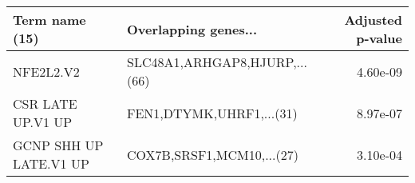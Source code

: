 \begin{tabular}{llr}
\toprule
        Term name (15) &          Overlapping genes... &  Adjusted p-value \\
\midrule
             NFE2L2.V2 & SLC48A1,ARHGAP8,HJURP,...(66) &          4.60e-09 \\
     CSR LATE UP.V1 UP &      FEN1,DTYMK,UHRF1,...(31) &          8.97e-07 \\
GCNP SHH UP LATE.V1 UP &     COX7B,SRSF1,MCM10,...(27) &          3.10e-04 \\
\bottomrule
\end{tabular}

